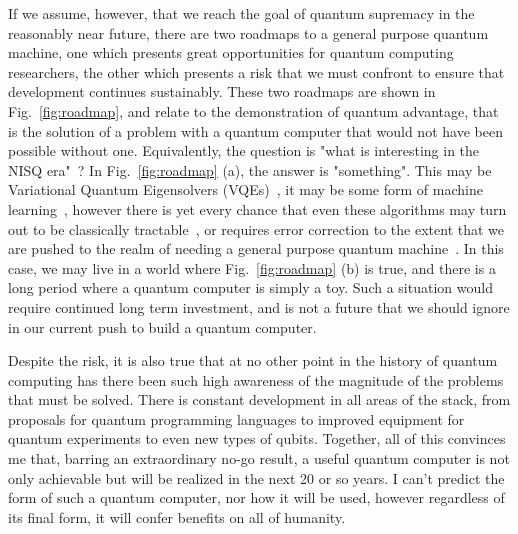 If we assume, however, that we reach the goal of quantum supremacy in the reasonably near future, there are two roadmaps to a general purpose quantum machine, one which
presents great opportunities for quantum computing researchers, the other which presents a risk that we must confront to ensure that development continues sustainably.
These two roadmaps are shown in Fig.~\ref{fig:roadmap}, and relate to the demonstration of quantum advantage, that is the solution of a problem with a quantum computer
that would not have been possible without one. Equivalently, the question is "what is interesting in the NISQ era"~\cite{Preskill2018quantumcomputingin}? In Fig.~\ref{fig:roadmap}
(a), the answer is "something". This may be Variational Quantum Eigensolvers (VQEs)~\cite{nature23879}, it may be some form of machine learning~\cite{PhysRevLett.121.040502},
however there is yet every chance that even these algorithms may turn out to be classically tractable~\cite{Tang:2019:QCA:3313276.3316310,10.1038/nphys3272}, or requires
error correction to the extent that we are pushed to the realm of needing a general purpose quantum machine~\cite{Reiher7555}. In this case, we may live in a world where
Fig.~\ref{fig:roadmap} (b) is true, and there is a long period where a quantum computer is simply a toy. Such a situation would require continued long term investment,
and is not a future that we should ignore in our current push to build a quantum computer.

Despite the risk, it is also true that at no other point in the history of quantum computing has there been such high awareness of the magnitude of the problems
that must be solved. There is constant development in all areas of the stack, from proposals for quantum programming languages to improved equipment for quantum
experiments to even new types of qubits. Together, all of this convinces me that, barring an extraordinary no-go result, a useful quantum computer is not only
achievable but will be realized in the next 20 or so years. I can't predict the form of such a quantum computer, nor how it will be used, however regardless of
its final form, it will confer benefits on all of humanity.
